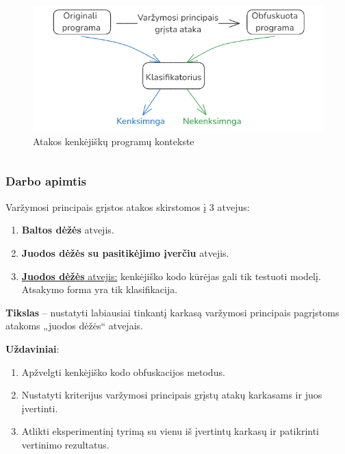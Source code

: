 \documentclass[12pt]{beamer}
\newcommand{\enquote}[1]{„#1“}
\begin{document}
\begin{frame}
\begin{columns}[b]
        \begin{figure}
            \begin{small}
                \begin{center}
                    \includegraphics[width=\textwidth]{resources/malware_adversarial.png}
                \end{center}
                \caption{Atakos kenkėjiškų programų kontekste}
                \label{fig:malware_adversarial}
            \end{small}
        \end{figure}
    \end{columns}

\end{frame}

\begin{frame}
    \frametitle{Darbo apimtis}

    Varžymosi principais grįstos atakos skirstomos į 3 atvejus:
    \begin{enumerate}
        \item \textbf{Baltos dėžės} atvejis.
        \item \textbf{Juodos dėžės su pasitikėjimo įverčiu} atvejis.
        \item \underline{\textbf{Juodos dėžės} atvejis:} kenkėjiško kodo kūrėjas gali tik testuoti modelį. Atsakymo forma yra tik klasifikacija.
    \end{enumerate} \pause
    \vspace{10pt}

    \textbf{Tikslas} -- nustatyti labiausiai tinkantį karkasą varžymosi principais pagrįstoms atakoms \enquote{juodos dėžės} atvejais. \pause

    \textbf{Uždaviniai}:
    \begin{enumerate}
        \item Apžvelgti kenkėjiško kodo obfuskacijos metodus.
        \item Nustatyti kriterijus varžymosi principais grįstų atakų karkasams ir juos
              įvertinti.
        \item Atlikti eksperimentinį tyrimą su vienu iš įvertintų karkasų ir patikrinti
              vertinimo rezultatus.
    \end{enumerate}

\end{frame}
\end{document}
